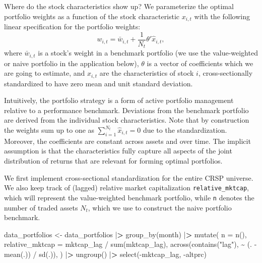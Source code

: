 \documentclass[
]{krantz}
\newenvironment{Shaded}{\begin{snugshade}}{\end{snugshade}}
\newcommand{\AttributeTok}[1]{\textcolor[rgb]{0.61,0.61,0.61}{#1}}
\newcommand{\ErrorTok}[1]{\textcolor[rgb]{0.14,0.14,0.14}{\textbf{#1}}}
\newcommand{\FunctionTok}[1]{\textcolor[rgb]{0,0,0}{#1}}
\newcommand{\NormalTok}[1]{#1}
\newcommand{\OtherTok}[1]{\textcolor[rgb]{0.37,0.37,0.37}{#1}}
\newcommand{\SpecialCharTok}[1]{\textcolor[rgb]{0,0,0}{#1}}
\newcommand{\StringTok}[1]{\textcolor[rgb]{0.5,0.5,0.5}{#1}}
\begin{document}
Where do the stock characteristics show up? We parameterize the optimal portfolio weights as a function of the stock characteristic \(x_{i,t}\) with the following linear specification for the portfolio weights:
\[w_{i,t} = \bar{w}_{i,t} + \frac{1}{N_t}\theta'\hat{x}_{i,t},\]
where \(\bar{w}_{i,t}\) is a stock's weight in a benchmark portfolio (we use the value-weighted or naive portfolio in the application below), \(\theta\) is a vector of coefficients which we are going to estimate, and \(\hat{x}_{i,t}\) are the characteristics of stock \(i\), cross-sectionally standardized to have zero mean and unit standard deviation.

Intuitively, the portfolio strategy is a form of active portfolio management relative to a performance benchmark. Deviations from the benchmark portfolio are derived from the individual stock characteristics. Note that by construction the weights sum up to one as \(\sum_{i=1}^{N_t}\hat{x}_{i,t} = 0\) due to the standardization. Moreover, the coefficients are constant across assets and over time. The implicit assumption is that the characteristics fully capture all aspects of the joint distribution of returns that are relevant for forming optimal portfolios.

We first implement cross-sectional standardization for the entire CRSP universe. We also keep track of (lagged) relative market capitalization \texttt{relative\_mktcap}, which will represent the value-weighted benchmark portfolio, while \texttt{n} denotes the number of traded assets \(N_t\), which we use to construct the naive portfolio benchmark.

\begin{Shaded}
\begin{Highlighting}[]
\NormalTok{data\_portfolios }\OtherTok{\textless{}{-}}\NormalTok{ data\_portfolios }\SpecialCharTok{|}\ErrorTok{\textgreater{}}
  \FunctionTok{group\_by}\NormalTok{(month) }\SpecialCharTok{|}\ErrorTok{\textgreater{}}
  \FunctionTok{mutate}\NormalTok{(}
    \AttributeTok{n =} \FunctionTok{n}\NormalTok{(),}
    \AttributeTok{relative\_mktcap =}\NormalTok{ mktcap\_lag }\SpecialCharTok{/} \FunctionTok{sum}\NormalTok{(mktcap\_lag),}
    \FunctionTok{across}\NormalTok{(}\FunctionTok{contains}\NormalTok{(}\StringTok{"lag"}\NormalTok{), }\SpecialCharTok{\textasciitilde{}}\NormalTok{ (. }\SpecialCharTok{{-}} \FunctionTok{mean}\NormalTok{(.)) }\SpecialCharTok{/} \FunctionTok{sd}\NormalTok{(.)),}
\NormalTok{  ) }\SpecialCharTok{|}\ErrorTok{\textgreater{}}
  \FunctionTok{ungroup}\NormalTok{() }\SpecialCharTok{|}\ErrorTok{\textgreater{}}
  \FunctionTok{select}\NormalTok{(}\SpecialCharTok{{-}}\NormalTok{mktcap\_lag, }\SpecialCharTok{{-}}\NormalTok{altprc)}
\end{Highlighting}
\end{Shaded}
\end{document}
